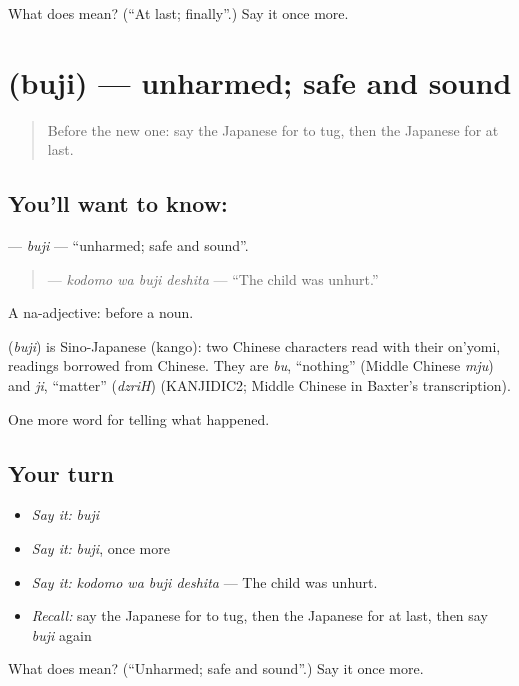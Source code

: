 \begin{tcolorbox}[breakable,colback=teal!4,colframe=teal!35!black,title={Before you move on}]
What does  mean? (\textquotedblleft{}At last; finally\textquotedblright{}.) Say it once more.
\end{tcolorbox}
\section[\texorpdfstring{\ja{ぶじ} (buji)}{ぶじ (buji)}]{ (buji) — unharmed; safe and sound}

\label{lesson:JA-C266-buji}



\begin{quote}
Before the new one: say the Japanese for to tug, then the Japanese for at last.
\end{quote}

\subsection*{You'll want to know: }
\textbf{} — \emph{buji} — \textquotedblleft{}unharmed; safe and sound\textquotedblright{}.

\begin{quote}
\textbf{ } — \emph{kodomo wa buji deshita} — \textquotedblleft{}The child was unhurt.\textquotedblright{}
\end{quote}

A na-adjective:  before a noun.

\begin{cousinweb}
\textbf{} (\emph{buji}) is Sino-Japanese (kango): two Chinese characters read with their on'yomi, readings borrowed from Chinese. They are \emph{bu}, \textquotedblleft{}nothing\textquotedblright{} (Middle Chinese \emph{mju}) and \emph{ji}, \textquotedblleft{}matter\textquotedblright{} (\emph{dzriH}) (KANJIDIC2; Middle Chinese in Baxter's transcription).
\end{cousinweb}

\begin{grammarlens}[title={What you've built}]
One more word for telling what happened.
\end{grammarlens}

\subsection*{Your turn}
\begin{itemize}
\raggedright
  \item \emph{Say it:} \emph{buji}
  \item \emph{Say it:} \emph{buji}, once more
  \item \emph{Say it:} \emph{kodomo wa buji deshita} — The child was unhurt.
  \item \emph{Recall:} say the Japanese for to tug, then the Japanese for at last, then say \emph{buji} again
\end{itemize}

\begin{tcolorbox}[breakable,colback=teal!4,colframe=teal!35!black,title={Before you move on}]
What does  mean? (\textquotedblleft{}Unharmed; safe and sound\textquotedblright{}.) Say it once more.
\end{tcolorbox}
